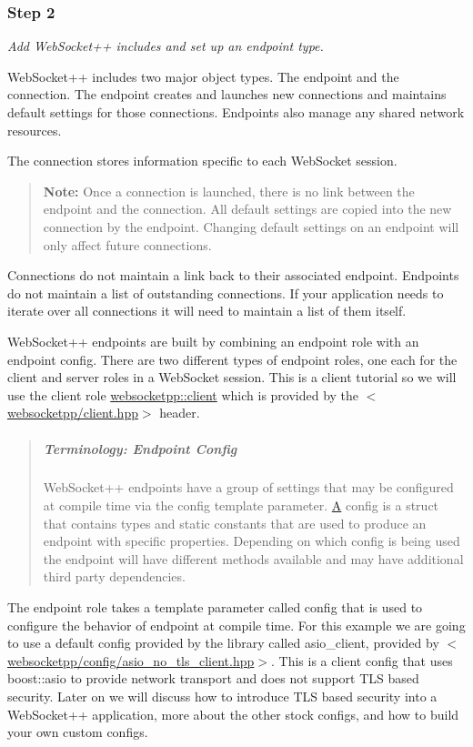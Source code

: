 \subsubsection*{Step 2}

{\itshape Add Web\+Socket++ includes and set up an endpoint type.}

Web\+Socket++ includes two major object types. The endpoint and the connection. The endpoint creates and launches new connections and maintains default settings for those connections. Endpoints also manage any shared network resources.

The connection stores information specific to each Web\+Socket session.

\begin{quote}
{\bfseries Note\+:} Once a connection is launched, there is no link between the endpoint and the connection. All default settings are copied into the new connection by the endpoint. Changing default settings on an endpoint will only affect future connections. \end{quote}
Connections do not maintain a link back to their associated endpoint. Endpoints do not maintain a list of outstanding connections. If your application needs to iterate over all connections it will need to maintain a list of them itself.

Web\+Socket++ endpoints are built by combining an endpoint role with an endpoint config. There are two different types of endpoint roles, one each for the client and server roles in a Web\+Socket session. This is a client tutorial so we will use the client role {\ttfamily \mbox{\hyperlink{classwebsocketpp_1_1client}{websocketpp\+::client}}} which is provided by the {\ttfamily $<$\mbox{\hyperlink{client_8hpp_source}{websocketpp/client.\+hpp}}$>$} header.

\begin{quote}
\subparagraph*{Terminology\+: Endpoint Config}

Web\+Socket++ endpoints have a group of settings that may be configured at compile time via the {\ttfamily config} template parameter. \mbox{\hyperlink{struct_a}{A}} config is a struct that contains types and static constants that are used to produce an endpoint with specific properties. Depending on which config is being used the endpoint will have different methods available and may have additional third party dependencies. \end{quote}


The endpoint role takes a template parameter called {\ttfamily config} that is used to configure the behavior of endpoint at compile time. For this example we are going to use a default config provided by the library called {\ttfamily asio\+\_\+client}, provided by {\ttfamily $<$\mbox{\hyperlink{asio__no__tls__client_8hpp_source}{websocketpp/config/asio\+\_\+no\+\_\+tls\+\_\+client.\+hpp}}$>$}. This is a client config that uses boost\+::asio to provide network transport and does not support T\+LS based security. Later on we will discuss how to introduce T\+LS based security into a Web\+Socket++ application, more about the other stock configs, and how to build your own custom configs.

